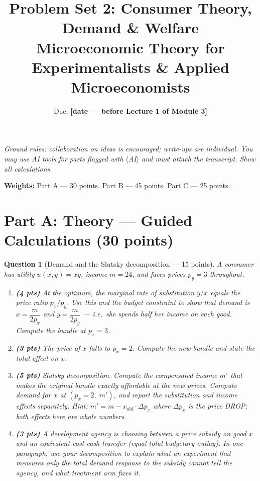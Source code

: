 \documentclass[11pt]{article}
\title{Problem Set 2: Consumer Theory, Demand \& Welfare\\
\large Microeconomic Theory for Experimentalists \& Applied Microeconomists}
\author{Due: \textbf{[date --- before Lecture 1 of Module 3]}}
\date{}
\newtheorem{question}{Question}
\begin{document}
\maketitle

\noindent\emph{Ground rules: collaboration on ideas is encouraged; write-ups
are individual. You may use AI tools for parts flagged with
$\langle$AI$\rangle$ and must attach the transcript. Show all calculations.}

\medskip

\noindent\textbf{Weights:} Part A --- 30 points. Part B --- 45 points.
Part C --- 25 points.

\bigskip

\section*{Part A: Theory --- Guided Calculations (30 points)}

\begin{question}[Demand and the Slutsky decomposition --- 15 points]
A consumer has utility $u(x, y) = xy$, income $m = 24$, and faces prices
$p_y = 3$ throughout.

\begin{enumerate}[label=(\alph*)]
  \item \textbf{(4 pts)} At the optimum, the marginal rate of substitution
        $y/x$ equals the price ratio $p_x/p_y$. Use this and the budget
        constraint to show that demand is $x = \dfrac{m}{2 p_x}$ and
        $y = \dfrac{m}{2 p_y}$ --- i.e.\ she spends half her income on
        each good. Compute the bundle at $p_x = 3$.
  \item \textbf{(3 pts)} The price of $x$ falls to $p_x = 2$. Compute the
        new bundle and state the total effect on $x$.
  \item \textbf{(5 pts)} Slutsky decomposition. Compute the compensated
        income $m'$ that makes the \emph{original} bundle exactly
        affordable at the new prices. Compute demand for $x$ at
        $(p_x = 2,\; m')$, and report the substitution and income effects
        separately. \emph{Hint: $m' = m - x_{\text{old}} \cdot \Delta p_x$
        where $\Delta p_x$ is the price DROP; both effects here are whole
        numbers.}
  \item \textbf{(3 pts)} A development agency is choosing between a price
        subsidy on good $x$ and an equivalent-cost cash transfer (equal
        total budgetary outlay). In one
        paragraph, use your decomposition to explain what an experiment
        that measures only the \emph{total} demand response to the subsidy
        cannot tell the agency, and what treatment arm fixes it.
\end{enumerate}
\end{question}
\end{document}
